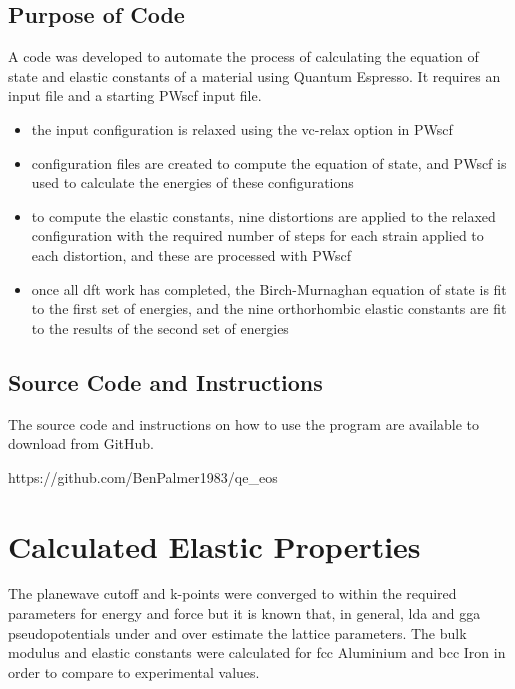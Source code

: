 \FloatBarrier
\subsection{Purpose of Code}

A code was developed to automate the process of calculating the equation of state and elastic constants of a material using Quantum Espresso.  It requires an input file and a starting PWscf input file.  

\begin{itemize}
\item the input configuration is relaxed using the vc-relax option in PWscf
\item configuration files are created to compute the equation of state, and PWscf is used to calculate the energies of these configurations
\item to compute the elastic constants, nine distortions are applied to the relaxed configuration with the required number of steps for each strain applied to each distortion, and these are processed with PWscf
\item once all \acrshort{dft} work has completed, the Birch-Murnaghan equation of state is fit to the first set of energies, and the nine orthorhombic elastic constants are fit to the results of the second set of energies
\end{itemize}


\FloatBarrier
\subsection{Source Code and Instructions}

The source code and instructions on how to use the program are available to download from GitHub.

https://github.com/BenPalmer1983/qe\_eos





\FloatBarrier
\section{Calculated Elastic Properties}
\label{section:resultselastic}

The planewave cutoff and k-points were converged to within the required parameters for energy and force but it is known that, in general, \acrshort{lda} and \acrshort{gga} pseudopotentials under and over estimate the lattice parameters.  The bulk modulus and elastic constants were calculated for \acrshort{fcc} Aluminium and \acrshort{bcc} Iron in order to compare to experimental values.

